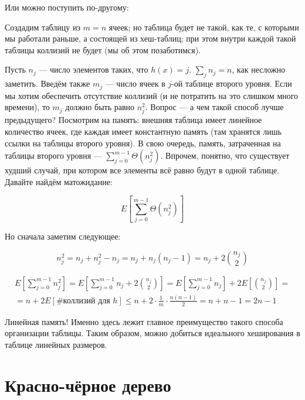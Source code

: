 \documentclass[a4paper,12pt]{article}
\begin{document}
Или можно поступить по-другому:

Создадим таблицу из $m = n$ ячеек; но таблица будет не такой, как те, с которыми мы работали раньше, а состоящей из хеш-таблиц; при этом внутри каждой такой таблицы коллизий не будет (мы об этом позаботимся).

Пусть $n_j$ --- число элементов таких, что $h(x) = j$. $\sum\limits_j n_j = n$, как несложно заметить. Введём также $m_j$ --- число ячеек в $j$-ой таблице второго уровня. Если мы хотим обеспечить отсутствие коллизий (и не потратить на это слишком много времени), то $m_j$ должно быть равно $n_j^2$. Вопрос --- а чем такой способ лучше предыдущего? Посмотрим на память: внешняя таблица имеет линейное количество ячеек, где каждая имеет константную память (там хранятся лишь ссылки на таблицы второго уровня). В свою очередь, память, затраченная на таблицы второго уровня --- $\sum\limits_{j=0}^{m-1} \Theta(n_j^2)$. Впрочем, понятно, что существует худший случай, при котором все элементы всё равно будут в одной таблице. Давайте найдём матожидание:

\[
    E\left[ \sum\limits_{j=0}^{m-1} \Theta(n_j^2) \right]
\]

Но сначала заметим следующее:

\[
    n_j^2 = n_j +n_j^2 - n_j = n_j+n_j(n_j-1) = n_j + 2{n_j \choose 2}
\]

\begin{multline*}
    E\left[ \sum\limits_{j=0}^{m-1} n_j^2 \right] = 
    E\left[ \sum\limits_{j=0}^{m-1} n_j + 2{n_j \choose 2} \right] = 
    E\left[ \sum\limits_{j=0}^{m-1} n_j \right] + 2E\left[{n_j \choose 2} \right] = \\ =
    n + 2E\left[ \text{\# коллизий для $h$} \right] \leqslant
    n + 2\cdot\frac{1}{m}\cdot\frac{n(n-1)}{2} =
    n + n - 1 =
    2n - 1
\end{multline*}

Линейная память! Именно здесь лежит главное преимущество такого способа организации таблицы. Таким образом, можно добиться идеального хеширования в таблице линейных размеров.

\newpage
\section{Красно-чёрное дерево}
\end{document}
